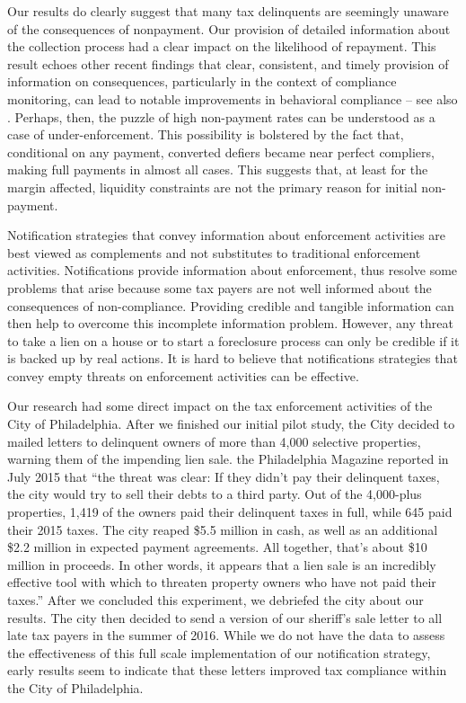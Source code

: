 \documentclass[12pt]{article}
\begin{document}
Our results do clearly suggest that many tax delinquents are seemingly
unaware of the consequences of nonpayment. Our provision of detailed
information about the collection process had a clear impact on the
likelihood of repayment. This result echoes other recent findings that
clear, consistent, and timely provision of information on
consequences, particularly in the context of compliance monitoring,
can lead to notable improvements in behavioral compliance -- see also
. Perhaps, then, the puzzle of high non-payment rates
can be understood as a case of under-enforcement. This possibility is
bolstered by the fact that, conditional on any payment, converted
defiers became near perfect compliers, making full payments in almost
all cases. This suggests that, at least for the margin affected,
liquidity constraints are not the primary reason for initial
non-payment.

Notification strategies that convey information about enforcement
activities are best viewed as complements and not substitutes to
traditional enforcement activities.  Notifications provide information
about enforcement, thus resolve some problems that arise because some
tax payers are not well informed about the consequences of
non-compliance.  Providing credible and tangible information can then
help to overcome this incomplete information problem.  However, any
threat to take a lien on a house or to start a foreclosure process can
only be credible if it is backed up by real actions. It is hard to
believe that notifications strategies that convey empty threats on
enforcement activities can be effective.

Our research had some direct impact on the tax enforcement activities
of the City of Philadelphia. After we finished our initial pilot
study, the City decided to mailed letters to delinquent owners of more
than 4,000 selective properties, warning them of the impending lien
sale. the Philadelphia Magazine reported in July 2015 that ``the
threat was clear: If they didn't pay their delinquent taxes, the city
would try to sell their debts to a third party. Out of the 4,000-plus
properties, 1,419 of the owners paid their delinquent taxes in full,
while 645 paid their 2015 taxes. The city reaped \$5.5 million in
cash, as well as an additional \$2.2 million in expected payment
agreements. All together, that's about \$10 million in proceeds. In
other words, it appears that a lien sale is an incredibly effective
tool with which to threaten property owners who have not paid their
taxes.'' After we concluded this experiment, we debriefed the city
about our results. The city then decided to send a version of our
sheriff's sale letter to all late tax payers in the summer of
2016. While we do not have the data to assess the effectiveness of
this full scale implementation of our notification strategy, early
results seem to indicate that these letters improved tax compliance
within the City of Philadelphia.


\newpage



\end{document}

